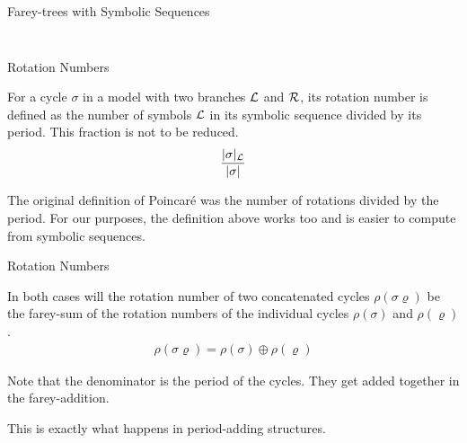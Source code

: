 \begin{frame}{Farey-trees with Symbolic Sequences}
\begin{columns}
\begin{column}{.3 \textwidth}
\begin{figure}
			\end{figure}
		\end{column}
	\end{columns}
\end{frame}

\begin{frame}{Rotation Numbers}
	\vspace{-1em}
	\begin{definition}
		For a cycle $\sigma$ in a model with two branches $\mathcal{L}$ and $\mathcal{R}$, its rotation number is defined as the number of symbols $\mathcal{L}$ in its symbolic sequence divided by its period.
		This fraction is not to be reduced.
		\begin{align*}
			\dfrac{|\sigma|_{\mathcal{L}}}{|\sigma|}
		\end{align*}
	\end{definition}
	\pause
	\begin{definition}
		The original definition of Poincaré was the number of rotations divided by the period.
		For our purposes, the definition above works too and is easier to compute from symbolic sequences.
	\end{definition}
\end{frame}

\begin{frame}{Rotation Numbers}
	\begin{theorem}
		In both cases will the rotation number of two concatenated cycles $\rho(\sigma\varrho)$ be the farey-sum of the rotation numbers of the individual cycles $\rho(\sigma)$ and $\rho(\varrho)$.
		\begin{align*}
			\rho(\sigma\varrho) = \rho(\sigma) \oplus \rho(\varrho)
		\end{align*}
	\end{theorem}
	\pause
	Note that the denominator is the period of the cycles.
	They get added together in the farey-addition.

	\vspace{1em}
	\pause
	This is exactly what happens in period-adding structures.
\end{frame}


